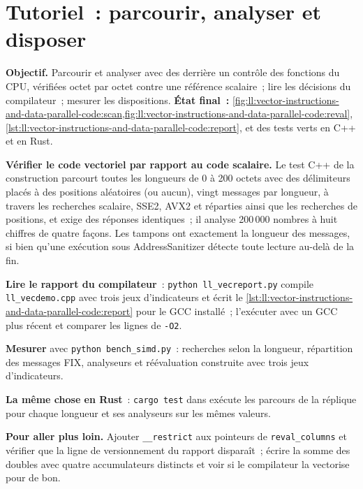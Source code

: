 \section{Tutoriel~: parcourir, analyser et disposer}\label{tut:ll:vector-instructions-and-data-parallel-code:tut}

\begin{tutorial}
\textbf{Objectif.} Parcourir et analyser avec des  derrière un contrôle des fonctions du CPU, vérifiées octet par octet contre une référence scalaire~; lire
les décisions du compilateur~; mesurer les dispositions. \textbf{État final~:}
\cref{fig:ll:vector-instructions-and-data-parallel-code:scan,fig:ll:vector-instructions-and-data-parallel-code:reval},
\cref{lst:ll:vector-instructions-and-data-parallel-code:report}, et des tests verts en C++ et en Rust.
\begin{tutsteps}
\item \textbf{Vérifier le code vectoriel par rapport au code scalaire.} Le test C++ de la construction parcourt toutes les longueurs de 0 à 200 octets avec
des délimiteurs placés à des positions aléatoires (ou aucun), vingt messages par longueur, à travers les recherches scalaire, SSE2, AVX2 et réparties
ainsi que les recherches de positions, et exige des réponses identiques~; il analyse 200\,000 nombres à huit chiffres de quatre façons. Les
tampons ont exactement la longueur des messages, si bien qu'une exécution sous AddressSanitizer détecte toute lecture au-delà de la fin.
\item \textbf{Lire le rapport du compilateur}~: \texttt{python ll\_vecreport.py} compile \texttt{ll\_vecdemo.cpp} avec trois jeux
d'indicateurs et écrit le \cref{lst:ll:vector-instructions-and-data-parallel-code:report} pour le GCC installé~; l'exécuter avec un
GCC plus récent et comparer les lignes de \texttt{-O2}.
\item \textbf{Mesurer} avec \texttt{python bench\_simd.py}~: recherches selon la longueur, répartition des messages FIX, analyseurs et
réévaluation construite avec trois jeux d'indicateurs.
\item \textbf{La même chose en Rust}~: \texttt{cargo test} dans  exécute les parcours de la réplique pour chaque longueur
et ses analyseurs sur les mêmes valeurs.
\end{tutsteps}
\textbf{Pour aller plus loin.} Ajouter \texttt{\_\_restrict} aux pointeurs de \texttt{reval\_columns} et vérifier que la
ligne de versionnement du rapport disparaît~; écrire la somme des doubles avec quatre accumulateurs distincts et voir si le compilateur
la vectorise pour de bon.
\end{tutorial}

